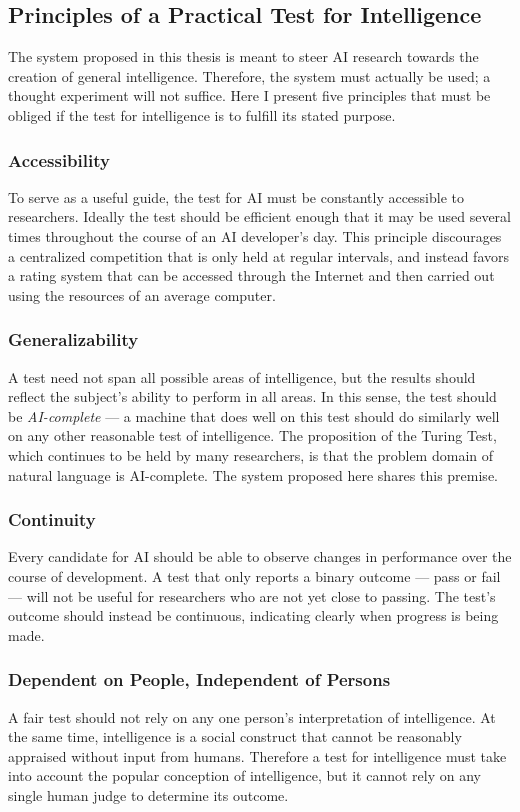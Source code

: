 \subsection{Principles of a Practical Test for Intelligence}

The system proposed in this thesis is meant to steer AI research towards the creation of general intelligence. Therefore, the system must actually be used; a thought experiment will not suffice. Here I present five principles that must be obliged if the test for intelligence is to fulfill its stated purpose.

\subsubsection{Accessibility}
To serve as a useful guide, the test for AI must be constantly accessible to researchers. Ideally the test should be efficient enough that it may be used several times throughout the course of an AI developer's day. This principle discourages a centralized competition that is only held at regular intervals, and instead favors a rating system that can be accessed through the Internet and then carried out using the resources of an average computer.

\subsubsection{Generalizability}
A test need not span all possible areas of intelligence, but the results should reflect the subject's ability to perform in all areas. In this sense, the test should be \textit{AI-complete} --- a machine that does well on this test should do similarly well on any other reasonable test of intelligence. The proposition of the Turing Test, which continues to be held by many researchers, is that the problem domain of natural language is AI-complete. The system proposed here shares this premise.

\subsubsection{Continuity}
Every candidate for AI should be able to observe changes in performance over the course of development. A test that only reports a binary outcome --- pass or fail --- will not be useful for researchers who are not yet close to passing. The test's outcome should instead be continuous, indicating clearly when progress is being made.

\subsubsection{Dependent on People, Independent of Persons}
A fair test should not rely on any one person's interpretation of intelligence. At the same time, intelligence is a social construct that cannot be reasonably appraised without input from humans. Therefore a test for intelligence must take into account the popular conception of intelligence, but it cannot rely on any single human judge to determine its outcome.


